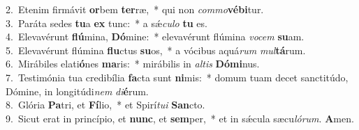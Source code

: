 {2.~}Etenim firmávit \textbf{or}bem \textbf{ter}ræ,~* qui non \textit{com}\textit{mo}\textbf{vé}\textbf{bi}tur.\\
{3.~}Paráta sedes \textbf{tu}a \textbf{ex} tunc:~* a sǽ\textit{cu}\textit{lo} \textbf{tu} es.\\
{4.~}Elevavérunt \textbf{flú}mina, \textbf{Dó}mine:~* elevavérunt flúmina \textit{vo}\textit{cem} \textbf{su}am.\\
{5.~}Elevavérunt flúmina \textbf{flu}ctus \textbf{su}os,~* a vócibus aquá\textit{rum} \textit{mul}\textbf{tá}rum.\\
{6.~}Mirábiles elati\textbf{ó}nes \textbf{ma}ris:~* mirábilis in \textit{al}\textit{tis} \textbf{Dó}\textbf{mi}nus.\\
{7.~}Testimónia tua credibília \textbf{fa}cta sunt \textbf{ni}mis:~* domum tuam decet sanctitúdo, Dómine, in longitúdi\textit{nem} \textit{di}\textbf{é}rum.\\
{8.~}Glória \textbf{Pa}tri, et \textbf{Fí}lio,~* et Spirí\textit{tu}\textit{i} \textbf{San}cto.\\
{9.~}Sicut erat in princípio, et \textbf{nunc}, et \textbf{sem}per,~* et in sǽcula sæcu\textit{ló}\textit{rum}. \textbf{A}men.\\

